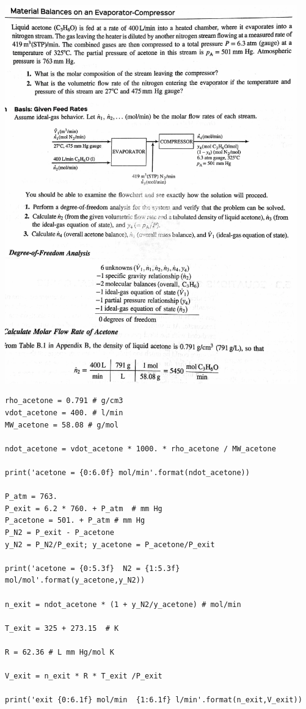 \documentclass[11pt]{article}
\begin{document}
\includegraphics[width=0.95\textwidth]{./figs/PartialPressure.png}

\begin{verbatim}
rho_acetone = 0.791 # g/cm3
vdot_acetone = 400. # l/min
MW_acetone = 58.08 # g/mol

ndot_acetone = vdot_acetone * 1000. * rho_acetone / MW_acetone

print('acetone = {0:6.0f} mol/min'.format(ndot_acetone))

P_atm = 763.
P_exit = 6.2 * 760. + P_atm  # mm Hg
P_acetone = 501. + P_atm # mm Hg
P_N2 = P_exit - P_acetone
y_N2 = P_N2/P_exit; y_acetone = P_acetone/P_exit

print('acetone = {0:5.3f}  N2 = {1:5.3f} mol/mol'.format(y_acetone,y_N2))

n_exit = ndot_acetone * (1 + y_N2/y_acetone) # mol/min

T_exit = 325 + 273.15  # K

R = 62.36 # L mm Hg/mol K

V_exit = n_exit * R * T_exit /P_exit

print('exit {0:6.1f} mol/min  {1:6.1f} l/min'.format(n_exit,V_exit))
\end{verbatim}
\end{document}
